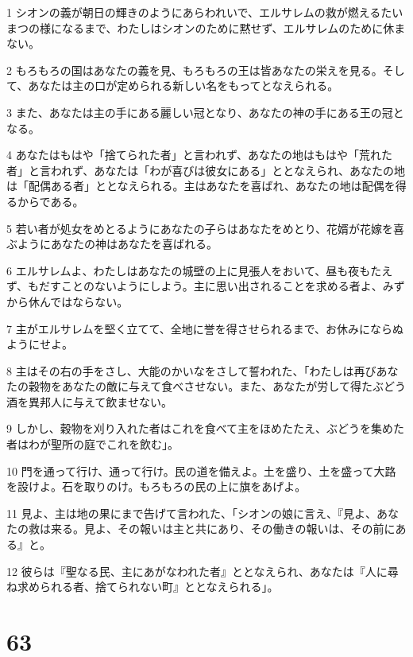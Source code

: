 \par 1 シオンの義が朝日の輝きのようにあらわれいで、エルサレムの救が燃えるたいまつの様になるまで、わたしはシオンのために黙せず、エルサレムのために休まない。
\par 2 もろもろの国はあなたの義を見、もろもろの王は皆あなたの栄えを見る。そして、あなたは主の口が定められる新しい名をもってとなえられる。
\par 3 また、あなたは主の手にある麗しい冠となり、あなたの神の手にある王の冠となる。
\par 4 あなたはもはや「捨てられた者」と言われず、あなたの地はもはや「荒れた者」と言われず、あなたは「わが喜びは彼女にある」ととなえられ、あなたの地は「配偶ある者」ととなえられる。主はあなたを喜ばれ、あなたの地は配偶を得るからである。
\par 5 若い者が処女をめとるようにあなたの子らはあなたをめとり、花婿が花嫁を喜ぶようにあなたの神はあなたを喜ばれる。
\par 6 エルサレムよ、わたしはあなたの城壁の上に見張人をおいて、昼も夜もたえず、もだすことのないようにしよう。主に思い出されることを求める者よ、みずから休んではならない。
\par 7 主がエルサレムを堅く立てて、全地に誉を得させられるまで、お休みにならぬようにせよ。
\par 8 主はその右の手をさし、大能のかいなをさして誓われた、「わたしは再びあなたの穀物をあなたの敵に与えて食べさせない。また、あなたが労して得たぶどう酒を異邦人に与えて飲ませない。
\par 9 しかし、穀物を刈り入れた者はこれを食べて主をほめたたえ、ぶどうを集めた者はわが聖所の庭でこれを飲む」。
\par 10 門を通って行け、通って行け。民の道を備えよ。土を盛り、土を盛って大路を設けよ。石を取りのけ。もろもろの民の上に旗をあげよ。
\par 11 見よ、主は地の果にまで告げて言われた、「シオンの娘に言え、『見よ、あなたの救は来る。見よ、その報いは主と共にあり、その働きの報いは、その前にある』と。
\par 12 彼らは『聖なる民、主にあがなわれた者』ととなえられ、あなたは『人に尋ね求められる者、捨てられない町』ととなえられる」。

\chapter{63}

